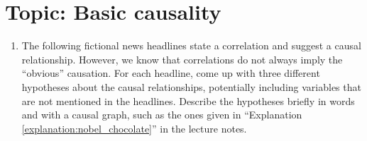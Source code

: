 \makeatletter
\g@addto@macro{\UrlBreaks}{\UrlOrds}
\makeatother


\section*{Topic: Basic causality}

\begin{enumerate}[label=1.\arabic*]
    \item %
    The following fictional news headlines state a correlation and suggest a causal relationship. However, we know that correlations do not always imply the ``obvious'' causation. For each headline, come up with three different hypotheses about the causal relationships, potentially including variables that are not mentioned in the headlines. Describe the hypotheses briefly in words and with a causal graph, such as the ones given in ``Explanation \ref*{explanation:nobel_chocolate}'' in the lecture notes.


\end{enumerate}
